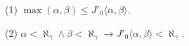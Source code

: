 (1) $\max(\alpha, \beta) \leq J'_0 \langle \alpha, \beta \rangle$.

(2) $\alpha < \aleph_\gamma \wedge \beta < \aleph_\gamma \rightarrow J'_0 \langle \alpha, \beta \rangle < \aleph_\gamma$.
